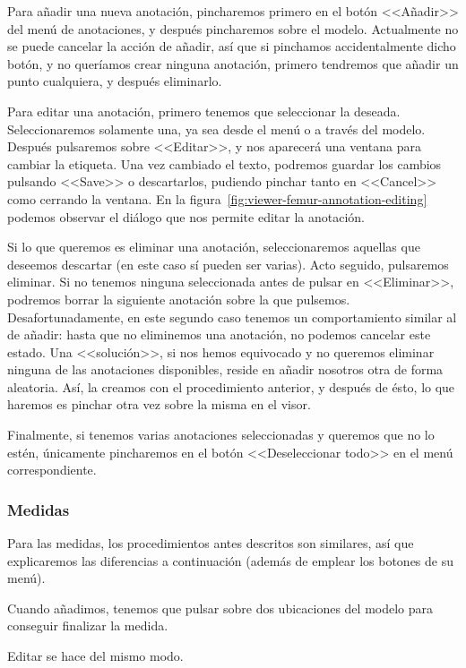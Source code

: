 Para añadir una nueva anotación, pincharemos primero en el botón <<Añadir>> del menú de anotaciones, y después pincharemos sobre el modelo. Actualmente no se puede cancelar la acción de añadir, así que si pinchamos accidentalmente dicho botón, y no queríamos crear ninguna anotación, primero tendremos que añadir un punto cualquiera, y después eliminarlo.

Para editar una anotación, primero tenemos que seleccionar la deseada. Seleccionaremos solamente una, ya sea desde el menú o a través del modelo. Después pulsaremos sobre <<Editar>>, y nos aparecerá una ventana para cambiar la etiqueta. Una vez cambiado el texto, podremos guardar los cambios pulsando <<Save>> o descartarlos, pudiendo pinchar tanto en <<Cancel>> como cerrando la ventana.
En la figura~\ref{fig:viewer-femur-annotation-editing} podemos observar el diálogo que nos permite editar la anotación.

Si lo que queremos es eliminar una anotación, seleccionaremos aquellas que deseemos descartar (en este caso sí pueden ser varias). Acto seguido, pulsaremos eliminar. Si no tenemos ninguna seleccionada antes de pulsar en <<Eliminar>>, podremos borrar la siguiente anotación sobre la que pulsemos. Desafortunadamente, en este segundo caso tenemos un comportamiento similar al de añadir: hasta que no eliminemos una anotación, no podemos cancelar este estado. Una <<solución>>, si nos hemos equivocado y no queremos eliminar ninguna de las anotaciones disponibles, reside en añadir nosotros otra de forma aleatoria. Así, la creamos con el procedimiento anterior, y después de ésto, lo que haremos es pinchar otra vez sobre la misma en el visor.

Finalmente, si tenemos varias anotaciones seleccionadas y queremos que no lo estén, únicamente pincharemos en el botón <<Deseleccionar todo>> en el menú correspondiente.

\subsubsection{Medidas}
Para las medidas, los procedimientos antes descritos son similares, así que explicaremos las diferencias a continuación (además de emplear los botones de su menú).

Cuando añadimos, tenemos que pulsar sobre dos ubicaciones del modelo para conseguir finalizar la medida.

Editar se hace del mismo modo.

